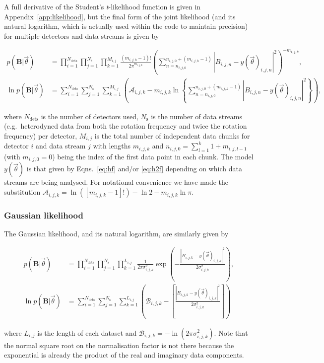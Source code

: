 A full derivative of the Student's {\it t}-likelihood function \citep[see e.g.][]{2005PhRvD..72j2002D} is given
in Appendix~\ref{app:likelihood}, but the final form of the joint likelihood (and its natural logarithm,
which is actually used within the code to maintain precision) for multiple detectors and data streams is
given by
\begin{widetext}
\begin{align}\label{eq:stlikelihood}
p(\mathbf{B}|\vec{\theta}) &= \prod_{i=1}^{N_{\text{dets}}} \prod_{j=1}^{N_{\text{s}}} \prod_{k=1}^{M_{i,j}}
\frac{(m_{i,j,k}-1)!}{2\pi^{m_{i,j,k}}}
\left(\sum_{n=n_{i,j,0}}^{n_{i,j,0}+(m_{i,j,k}-1)} |B_{i,j,n}-y(\vec{\theta})_{i,j,n}|^2\right)^{-m_{i,j,k}},
\nonumber \\
\ln{p(\mathbf{B}|\vec{\theta})} &= \sum_{i=1}^{N_{\text{dets}}} \sum_{j=1}^{N_{\text{s}}}
\sum_{k=1}^{M_{i,j}} \left( \mathcal{A}_{i,j,k} - m_{i,j,k}\ln{
\left\{\sum_{n=n_{i,j,0}}^{n_{i,j,0}+(m_{i,j,k}-1)} |B_{i,j,n}-y(\vec{\theta})_{i,j,n}|^2\right\}}
\right),
\end{align}
\end{widetext}
where $N_{\text{dets}}$ is the number of detectors used, $N_{\text{s}}$ is the number of data streams (e.g.\
heterodyned data from both the rotation frequency and twice the rotation frequency) per detector, $M_{i,j}$ is
the total number of independent data chunks for detector $i$ and data stream $j$ with lengths $m_{i,j,k}$ and
$n_{i,j,0} = \sum_{l=1}^{k} 1+m_{i,j,l-1}$ (with $m_{i,j,0} = 0$) being the index of the first data point in
each chunk. The model $y(\vec{\theta})$ is that given by Eqns.~\ref{eq:hf} and/or \ref{eq:h2f}
depending on which data streams are being analysed. For notational convenience we have made the substitution
$\mathcal{A}_{i,j,k} = \ln{\left([m_{i,j,k}-1]!\right)} - \ln{2} - m_{i,j,k}\ln{\pi}$.

\subsubsection{Gaussian likelihood}\label{sec:glikelihood}

The Gaussian likelihood, and its natural logarithm, are similarly given by
\begin{widetext}
\begin{align}\label{eq:gausslikelihood}
p(\mathbf{B}|\vec{\theta}) &= \prod_{i=1}^{N_{\text{dets}}} \prod_{j=1}^{N_{\text{s}}} \prod_{k=1}^{L_{i,j}}
\frac{1}{2\pi\sigma_{i,j,k}^2}\exp{\left(-\frac{|B_{i,j,k}-y(\vec{\theta})_{i,j,k}|^2}{2\sigma_{i,j,k}^2}
\right)}, \nonumber \\
\ln{p(\mathbf{B}|\vec{\theta})} &= \sum_{i=1}^{N_{\text{dets}}} \sum_{j=1}^{N_{\text{s}}}
\sum_{k=1}^{L_{i,j}} \left(\mathcal{B}_{i,j,k} -
\left[\frac{|B_{i,j,k}-y(\vec{\theta})_{i,j,k}|^2}{2\sigma_{i,j,k}^2 } \right] \right)
\end{align}
\end{widetext}
where $L_{i,j}$ is the length of each dataset and $\mathcal{B}_{i,j,k} = -\ln{(2\pi\sigma_{i,j,k}^2)}$. Note
that the normal square root on the normalisation factor is not there because the exponential is already the
product of the real and imaginary data components.

